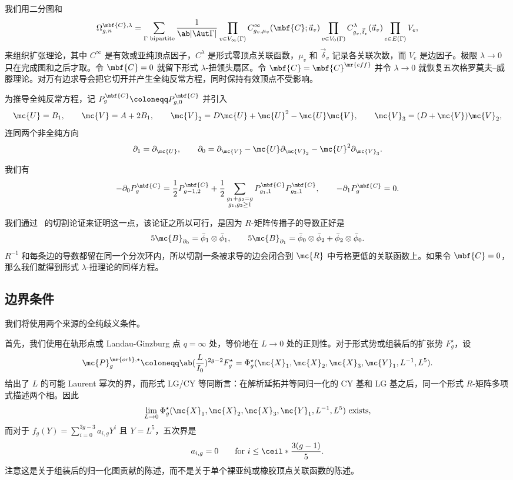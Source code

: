 我们用二分图和
\[ \Omega^{\mbf{C},\lambda}_{g,n} = \sum_{\Gamma \text{ bipartite}} \frac{1}{\ab|\Aut\Gamma|}\prod_{v\in V_{\infty}(\Gamma)} C^{\infty}_{g_v,\mu_v}(\mbf{C};\vec{a}_v) \prod_{v \in V_0(\Gamma)}C^{\lambda}_{g_v,\vec{\delta}_v}(\vec{a}_v)\prod_{e \in E(\Gamma)}V_e, \]
来组织扩张理论，其中 \(C^{\infty}\) 是有效或亚纯顶点因子，\(C^{\lambda}\) 是形式零顶点关联函数，\(\mu_v\) 和 \(\vec{\delta}_v\) 记录各关联次数，而 \(V_e\) 是边因子。极限 \(\lambda \to 0\) 只在完成图和之后才取。令 \(\mbf{C}=0\) 就留下形式 \(\lambda\)-扭领头扇区。令 \(\mbf{C}=\mbf{C}^{\mr{eff}}\) 并令 \(\lambda\to0\) 就恢复五次格罗莫夫–威滕理论。对万有边求导会把它切开并产生全纯反常方程，同时保持有效顶点不受影响。

为推导全纯反常方程，记 \(P^{\mbf{C}}_g \coloneqq P^{\mbf{C}}_{g,0}\) 并引入
\[ \mc{U} = B_1, \qquad \mc{V} = A + 2B_1, \qquad \mc{V}_2 = D\mc{U} + \mc{U}^2 - \mc{U}\mc{V}, \qquad \mc{V}_3 = (D+\mc{V})\mc{V}_2, \]
连同两个非全纯方向
\[ \partial_1 = \partial_{\mc{U}}, \qquad \partial_0 = \partial_{\mc{V}} - \mc{U}\partial_{\mc{V}_2} - \mc{U}^2\partial_{\mc{V}_3}. \]

\begin{thm}
    我们有
    \[ -\partial_0 P^{\mbf{C}}_g = \frac{1}{2}P^{\mbf{C}}_{g-1,2} + \frac{1}{2}\sum_{\substack{g_1+g_2=g\\g_1,g_2\geq1}}P^{\mbf{C}}_{g_1,1}P^{\mbf{C}}_{g_2,1}, \qquad -\partial_1 P^{\mbf{C}}_g = 0. \]
\end{thm}

我们通过~ 的切割论证来证明这一点，该论证之所以可行，是因为 \(R\)-矩阵传播子的导数正好是
\[ 5\mc{B}_{\partial_0} = \bar{\phi}_1 \otimes \bar{\phi}_1, \qquad 5\mc{B}_{\partial_1} = \bar{\phi}_0\otimes\bar{\phi}_2 + \bar{\phi}_2\otimes\bar{\phi}_0. \]
\(R^{-1}\) 和每条边的导数都留在同一个分次环内，所以切割一条被求导的边会闭合到 \(\mc{R}\) 中亏格更低的关联函数上。如果令 \(\mbf{C}=0\)，那么我们就得到形式 \(\lambda\)-扭理论的同样方程。

\subsection{边界条件}%
\label{sub:Boundary conditions}

我们将使用两个来源的全纯歧义条件。

首先，我们使用在轨形点或 Landau-Ginzburg 点 \(q = \infty\) 处，等价地在 \(L \to 0\) 处的正则性。对于形式势或组装后的扩张势 \(F_g^{\star}\)，设
\[ \mc{P}_g^{\mr{orb},\star} \coloneqq \ab(\frac{L}{I_0})^{2g-2}F_g^{\star} = \Phi_g^{\star}(\mc{X}_1,\mc{X}_2,\mc{X}_3,\mc{Y}_1,L^{-1},L^5). \]
 给出了 \(L\) 的可能 Laurent 幂次的界，而形式 LG/CY 等同断言：在解析延拓并等同归一化的 CY 基和 LG 基之后，同一个形式 \(R\)-矩阵多项式描述两个相。因此
\[ \lim_{L\to0}\Phi_g^{\star}(\mc{X}_1,\mc{X}_2,\mc{X}_3,\mc{Y}_1,L^{-1},L^5) \text{ exists}, \]
而对于 \(f_g(Y) = \sum_{i=0}^{3g-3}a_{i,g}Y^i\) 且 \(Y = L^5\)，五次界是
\[ a_{i,g} = 0 \qquad \text{for } i \leq \ceil*{\frac{3(g-1)}{5}}. \]
注意这是关于组装后的归一化图贡献的陈述，而不是关于单个裸亚纯或橡胶顶点关联函数的陈述。

